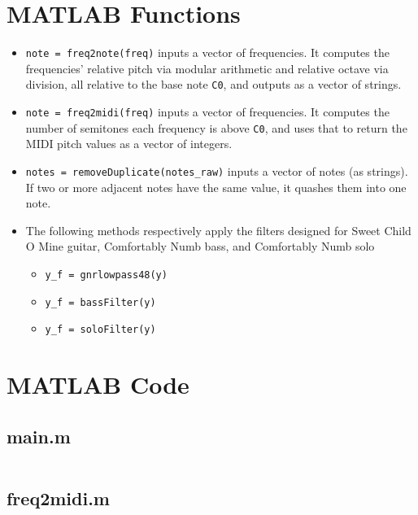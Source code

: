 \documentclass{article}
\begin{document}
\begin{appendices}

\section{MATLAB Functions}

\begin{itemize}
    \item \texttt{note = freq2note(freq)} inputs a vector of frequencies. It computes the frequencies' relative pitch via modular arithmetic and relative octave via division, all relative to the base note \texttt{C0}, and outputs as a vector of strings.
    
    \item \texttt{note = freq2midi(freq)} inputs a vector of frequencies. It computes the number of semitones each frequency is above \texttt{C0}, and uses that to return the MIDI pitch values as a vector of integers.
    
    \item \texttt{notes = removeDuplicate(notes\_raw)} inputs a vector of notes (as strings). If two or more adjacent notes have the same value, it quashes them into one note.
    
    \item The following methods respectively apply the filters designed for Sweet Child O Mine guitar, Comfortably Numb bass, and Comfortably Numb solo
    
    \begin{itemize}
       	\item \texttt{y\_f = gnrlowpass48(y)}
    	\item \texttt{y\_f = bassFilter(y)}
    	\item \texttt{y\_f = soloFilter(y)} 
    \end{itemize}
\end{itemize}

\section{MATLAB Code}

\subsection{main.m}

\inputminted{matlab}{main.m}
\subsection{freq2midi.m}
\inputminted{matlab}{freq2midi.m}

\end{appendices}
\end{document}
